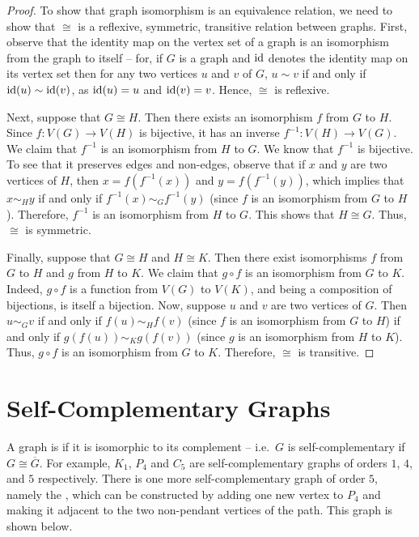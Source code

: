 \begin{proof}
To show that graph isomorphism is an equivalence relation, we need to show that $\cong$ is a reflexive, symmetric, transitive relation between graphs. First, observe that the identity map on the vertex set of a graph is an isomorphism from the graph to itself -- for, if $G$ is a graph and $\mathrm{id}$ denotes the identity map on its vertex set then for any two vertices $u$ and $v$ of $G$, $u \sim v$ if and only if $\mathrm{id}(u) \sim \mathrm{id}(v)$, as $\mathrm{id}(u) = u$ and $\mathrm{id}(v) = v$. Hence, $\cong$ is reflexive.

Next, suppose that $G \cong H$. Then there exists an isomorphism $f$ from $G$ to $H$. Since $f \colon V(G) \to V(H)$ is bijective, it has an inverse $f^{-1} \colon V(H) \to V(G)$. We claim that $f^{-1}$ is an isomorphism from $H$ to $G$. We know that $f^{-1}$ is bijective. To see that it preserves edges and non-edges, observe that if $x$ and $y$ are two vertices of $H$, then $x = f(f^{-1}(x))$ and $y = f(f^{-1}(y))$, which implies that $x \sim_H y$ if and only if $f^{-1}(x) \sim_G f^{-1}(y)$ (since $f$ is an isomorphism from $G$ to $H$). Therefore, $f^{-1}$ is an isomorphism from $H$ to $G$. This shows that $H \cong G$. Thus, $\cong$ is symmetric.

Finally, suppose that $G \cong H$ and $H \cong K$. Then there exist isomorphisms $f$ from $G$ to $H$ and $g$ from $H$ to $K$. We claim that $g \circ f$ is an isomorphism from $G$ to $K$. Indeed, $g \circ f$ is a function from $V(G)$ to $V(K)$, and being a composition of bijections, is itself a bijection. Now, suppose $u$ and $v$ are two vertices of $G$. Then $u \sim_G v$ if and only if $f(u) \sim_H f(v)$ (since $f$ is an isomorphism from $G$ to $H$) if and only if $g(f(u)) \sim_K g(f(v))$ (since $g$ is an isomorphism from $H$ to $K$). Thus, $g \circ f$ is an isomorphism from $G$ to $K$. Therefore, $\cong$ is transitive.
\end{proof}


\section{Self-Complementary Graphs}\label{sec:SC}

A graph is  if it is isomorphic to its complement -- i.e.\ $G$ is self-complementary if $G \cong \overline G$. For example, $K_1$, $P_4$ and $C_5$ are self-complementary graphs of orders $1$, $4$, and $5$ respectively. There is one more self-complementary graph of order $5$, namely the , which can be constructed by adding one new vertex to $P_4$ and making it adjacent to the two non-pendant vertices of the path. This graph is shown below.

